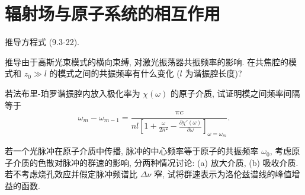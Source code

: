 \documentclass{note}
\begin{document}
\setcounter{chapter}{8}
\fi
\chapter{辐射场与原子系统的相互作用}
\begin{exe}
    推导方程式 (9.3-22).
\end{exe}
\begin{pf}

\end{pf}

\begin{exe}
    推导由于高斯光束模式的横向束缚, 对激光振荡器共振频率的影响. 在共焦腔的模式和 $z_0\gg l$ 的模式之间的共振频率有什么变化 ($l$ 为谐振腔长度)?
\end{exe}
\begin{pf}
    
\end{pf}

\begin{exe}
    若法布里-珀罗谐振腔内放入极化率为 $\chi(\omega)$ 的原子介质, 试证明模之间频率间隔等于
    \[
        \omega_m-\omega_{m-1}=\frac{\pi c}{nl\left[1+\frac{\omega}{2n^2}-\frac{\partial\chi'(\omega)}{\partial\omega}\right]_{\omega=\omega_m}}.
    \]
\end{exe}
\begin{pf}
    
\end{pf}

\begin{exe}
    若一个光脉冲在原子介质中传播, 脉冲的中心频率等于原子的共振频率 $\omega_0$, 考虑原子介质的色散对脉冲的群速的影响, 分两种情况讨论: (a) 放大介质, (b) 吸收介质. 若不考虑烧孔效应并假定脉冲频谱比 $\Delta\nu$ 窄, 试将群速表示为洛伦兹谱线的峰值增益的函数.
\end{exe}
\begin{sol}

\end{sol}
\end{document}

